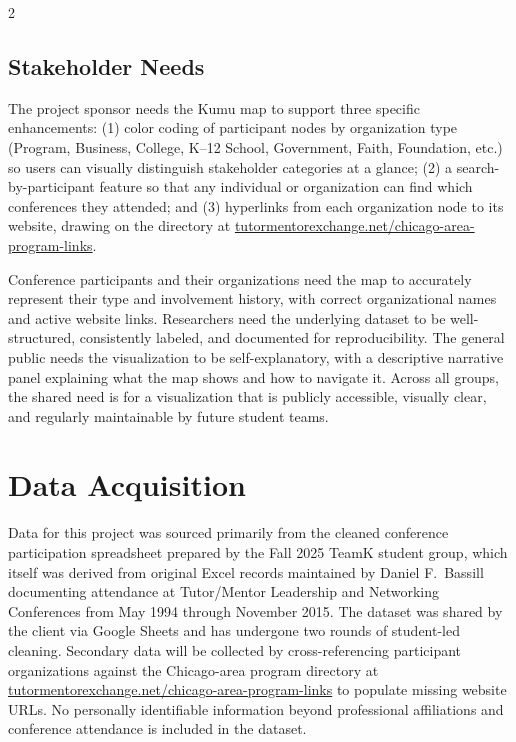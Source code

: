 \documentclass[11pt,letterpaper]{article}
\begin{document}
\begin{multicols}{2}
\subsection{Stakeholder Needs}

The project sponsor needs the Kumu map to support three specific enhancements:
(1) color coding of participant nodes by organization type (Program, Business,
College, K--12 School, Government, Faith, Foundation, etc.) so users can
visually distinguish stakeholder categories at a glance; (2) a
search-by-participant feature so that any individual or organization can find
which conferences they attended; and (3) hyperlinks from each organization node
to its website, drawing on the directory at
\href{https://tutormentorexchange.net/chicago-area-program-links}{tutormentorexchange.net/chicago-area-program-links}.

Conference participants and their organizations need the map to accurately
represent their type and involvement history, with correct organizational names
and active website links. Researchers need the underlying dataset to be
well-structured, consistently labeled, and documented for reproducibility. The
general public needs the visualization to be self-explanatory, with a
descriptive narrative panel explaining what the map shows and how to navigate
it. Across all groups, the shared need is for a visualization that is publicly
accessible, visually clear, and regularly maintainable by future student teams.

\section{Data Acquisition}

Data for this project was sourced primarily from the cleaned conference
participation spreadsheet prepared by the Fall 2025 TeamK student group, which
itself was derived from original Excel records maintained by Daniel F.\ Bassill
documenting attendance at Tutor/Mentor Leadership and Networking Conferences
from May 1994 through November 2015. The dataset was shared by the client via
Google Sheets and has undergone two rounds of student-led cleaning. Secondary
data will be collected by cross-referencing participant organizations against
the Chicago-area program directory at
\href{https://tutormentorexchange.net/chicago-area-program-links}{tutormentorexchange.net/chicago-area-program-links}
to populate missing website URLs. No personally identifiable information beyond
professional affiliations and conference attendance is included in the dataset.


\end{multicols}
\end{document}
